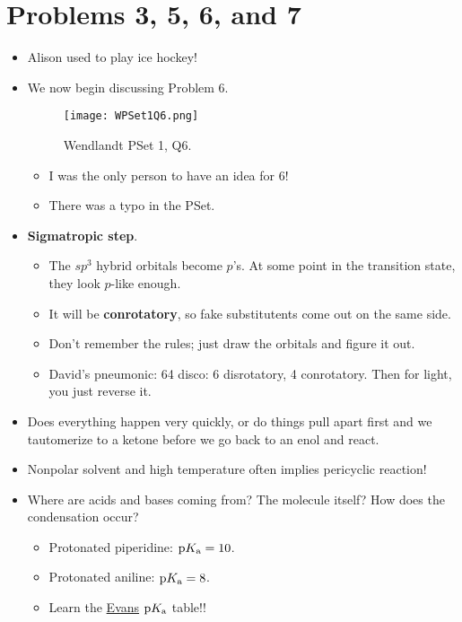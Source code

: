 \documentclass[../notes.tex]{subfiles}
\begin{document}
\section{Problems 3, 5, 6, and 7}
\begin{itemize}
    \item {}Alison used to play ice hockey!
    \item We now begin discussing Problem 6.
    \begin{figure}[h!]
        \centering
        \texttt{[image: WPSet1Q6.png]}
        \caption{Wendlandt PSet 1, Q6.}
        \label{fig:WPSet1Q6}
    \end{figure}
    \begin{itemize}
        \item I was the only person to have an idea for 6!
        \item There was a typo in the PSet.
    \end{itemize}
    \item \textbf{Sigmatropic step}.
    \begin{itemize}
        \item The $sp^3$ hybrid orbitals become $p$'s. At some point in the transition state, they look $p$-like enough.
        \item It will be \textbf{conrotatory}, so fake substitutents come out on the same side.
        \item Don't remember the rules; just draw the orbitals and figure it out.
        \item David's pneumonic: 64 disco: 6 disrotatory, 4 conrotatory. Then for light, you just reverse it.
    \end{itemize}
    \item Does everything happen very quickly, or do things pull apart first and we tautomerize to a ketone before we go back to an enol and react.
    \item Nonpolar solvent and high temperature often implies pericyclic reaction!
    \item Where are acids and bases coming from? The molecule itself? How does the condensation occur?
    \begin{itemize}
        \item Protonated piperidine: $\textup{p}K_\textup{a}=10$.
        \item Protonated aniline: $\textup{p}K_\textup{a}=8$.
        \item Learn the \href{http://ccc.chem.pitt.edu/wipf/MechOMs/evans_pKa_table.pdf}{Evans} $\textup{p}K_\textup{a}$ table!!

\end{itemize}
\end{itemize}
\end{document}
